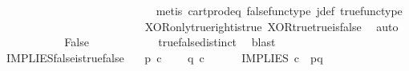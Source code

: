 \begin{isabellebody}
\ \ \ \ \ \ \ \ \isamarkupfalse%
\ \isamarkupfalse%
\ {\isachardoublequoteopen}{\isasymlangle}{\isasymt}{\isacharcomma}{\kern0pt}\ {\isasymt}{\isasymrangle}\ {\isacharequal}{\kern0pt}\ {\isasymlangle}{\isasymf}{\isacharcomma}{\kern0pt}\ {\isasymt}{\isasymrangle}{\isachardoublequoteclose}\isanewline
\ \ \ \ \ \ \ \ \ \ \isamarkupfalse%
\ {\isacharparenleft}{\kern0pt}metis\ cart{\isacharunderscore}{\kern0pt}prod{\isacharunderscore}{\kern0pt}eq{}\ false{\isacharunderscore}{\kern0pt}func{\isacharunderscore}{\kern0pt}type\ j{\isacharunderscore}{\kern0pt}def\ true{\isacharunderscore}{\kern0pt}func{\isacharunderscore}{\kern0pt}type{\isacharparenright}{\kern0pt}\isanewline
\ \ \ \ \ \ \ \ \isamarkupfalse%
\ \isamarkupfalse%
\ {\isachardoublequoteopen}{\isasymt}\ {\isacharequal}{\kern0pt}\ {\isasymf}{\isachardoublequoteclose}\isanewline
\ \ \ \ \ \ \ \ \ \ \isamarkupfalse%
\ XOR{\isacharunderscore}{\kern0pt}only{\isacharunderscore}{\kern0pt}true{\isacharunderscore}{\kern0pt}right{\isacharunderscore}{\kern0pt}is{\isacharunderscore}{\kern0pt}true\ XOR{\isacharunderscore}{\kern0pt}true{\isacharunderscore}{\kern0pt}true{\isacharunderscore}{\kern0pt}is{\isacharunderscore}{\kern0pt}false\ \isamarkupfalse%
\ auto\isanewline
\ \ \ \ \ \ \ \ \isamarkupfalse%
\ \isamarkupfalse%
\ False\isanewline
\ \ \ \ \ \ \ \ \ \ \isamarkupfalse%
\ true{\isacharunderscore}{\kern0pt}false{\isacharunderscore}{\kern0pt}distinct\ \isamarkupfalse%
\ blast\isanewline
\ \ \ \ \ \ \isamarkupfalse%
\isanewline
\ \ \ \ \isamarkupfalse%
\isanewline
\ \ \isamarkupfalse%
\isanewline
{}\isamarkupfalse%
%
\endisatagproof
{\isafoldproof}%
%
\isadelimproof
\isanewline
%
\endisadelimproof
\isanewline
{}\isamarkupfalse%
\ IMPLIES{\isacharunderscore}{\kern0pt}false{\isacharunderscore}{\kern0pt}is{\isacharunderscore}{\kern0pt}true{\isacharunderscore}{\kern0pt}false{\isacharcolon}{\kern0pt}\isanewline
\ \ \ {\isachardoublequoteopen}p\ {\isasymin}\isactrlsub c\ {\isasymOmega}{\isachardoublequoteclose}\isanewline
\ \ \ {\isachardoublequoteopen}q\ {\isasymin}\isactrlsub c\ {\isasymOmega}{\isachardoublequoteclose}\ \ \isanewline
\ \ \ {\isachardoublequoteopen}IMPLIES\ {\isasymcirc}\isactrlsub c\ \ {\isasymlangle}p{\isacharcomma}{\kern0pt}q{\isasymrangle}\ {\isacharequal}{\kern0pt}\ {\isasymf}{\isachardoublequoteclose}\isanewline

\end{isabellebody}
